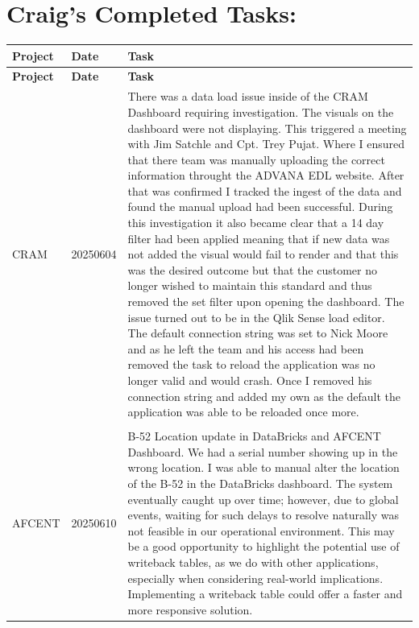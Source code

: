 \documentclass{article}
\begin{document}


\section*{\centering \textbf{ Craig's Completed Tasks: }}
\label{sec:craig_tasks}


\begin{longtable}{@{}p{2.5cm} p{2.5cm} p{9cm}@{}}
\toprule
\textbf{ Project } & \textbf{ Date } & \textbf{ Task } \\
\midrule
\endfirsthead

\toprule
\textbf{ Project } & \textbf{ Date } & \textbf{ Task } \\
\midrule
\endhead

\bottomrule
\endfoot


CRAM & 20250604 & There was a data load issue inside of the CRAM Dashboard requiring investigation. The visuals on the dashboard were not displaying. This triggered a meeting with Jim Satchle and Cpt. Trey Pujat. Where I ensured that there team was manually uploading the correct information throught the ADVANA EDL website. After that was confirmed I tracked the ingest of the data and found the manual upload had been successful. During this investigation it also became clear that a 14 day filter had been applied meaning that if new data was not added the visual would fail to render and that this was the desired outcome but that the customer no longer wished to maintain this standard and thus removed the set filter upon opening the dashboard. The issue turned out to be in the Qlik Sense load editor. The default connection string was set to Nick Moore and as he left the team and his access had been removed the task to reload the application was no longer valid and would crash. Once I removed his connection string and added my own as the default the application was able to be reloaded once more. \\

\\[-0.5ex]  %


AFCENT & 20250610 & B-52 Location update in DataBricks and AFCENT Dashboard. We had a serial number showing up in the wrong location. I was able to manual alter the location of the B-52 in the DataBricks dashboard. The system eventually caught up over time; however, due to global events, waiting for such delays to resolve naturally was not feasible in our operational environment. This may be a good opportunity to highlight the potential use of writeback tables, as we do with other applications, especially when considering real-world implications. Implementing a writeback table could offer a faster and more responsive solution. \\


\end{longtable}
\end{document}
